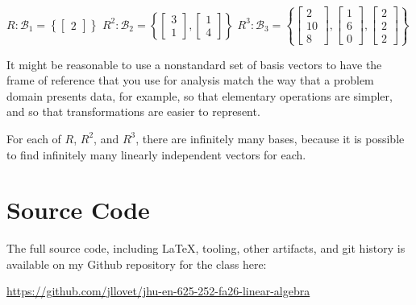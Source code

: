 \documentclass[10pt,letterpaper,final]{report}
\begin{document}
$R: \mathcal{B}_1 = \left\{\begin{bmatrix}
    2
  \end{bmatrix}\right\}$
\medskip
$R^2: \mathcal{B}_2 = \left\{\begin{bmatrix}
    3 \\
    1
  \end{bmatrix}, \begin{bmatrix}
    1 \\
    4
  \end{bmatrix}\right\}$
\medskip
$R^3: \mathcal{B}_3 = \left\{\begin{bmatrix}
    2  \\
    10 \\
    8
  \end{bmatrix}, \begin{bmatrix}
    1 \\
    6 \\
    0
  \end{bmatrix},\begin{bmatrix}
    2 \\
    2 \\
    2
  \end{bmatrix}\right\}$

It might be reasonable to use a nonstandard set of basis vectors to have the frame of reference that you use for analysis match the way that a problem domain presents data, for example, so that elementary operations are simpler, and so that transformations are easier to represent.

For each of $R$, $R^2$, and $R^3$, there are infinitely many bases, because it is possible to find infinitely many linearly independent vectors for each.

\pagebreak

\section*{Source Code}
The full source code, including LaTeX, tooling, other artifacts, and git history is available on my Github repository for the class here:
\begin{center}
  \url{https://github.com/jllovet/jhu-en-625-252-fa26-linear-algebra}
\end{center}

\printbibliography
\end{document}
